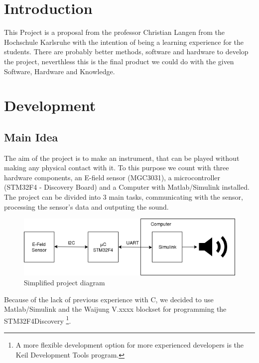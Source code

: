 \documentclass{article}
\begin{document}
\section{Introduction}

\noindent This Project is a proposal from the professor Christian Langen from the Hochschule Karlsruhe with the intention of being a learning experience for the students. There are probably better methods, software and hardware to develop the project, neverthless this is the final product we could do with the given Software, Hardware and Knowledge. 

\section{Development}

\subsection{Main Idea}

\noindent The aim of the project is to make an instrument, that can be played without making any physical contact with it. To this purpose we count with three hardware components, an E-field sensor (MGC3031), a microcontroller (STM32F4 - Discovery Board) and a Computer with Matlab/Simulink installed. The project can be divided into 3 main tasks, communicating with the sensor, processing the sensor's data and outputing the sound.  

\begin{figure}[h]
\centering
\includegraphics[width=12cm]{MainIdea.png}  
\caption{Simplified project diagram}
\end{figure}

\noindent Because of the lack of previous experience with C, we decided to use Matlab/Simulink and the Waijung V.xxxx blockset for programming the STM32F4Discovery \footnote{A more flexible development option for more experienced developers is the Keil Development Tools program.}. 

\end{document}
